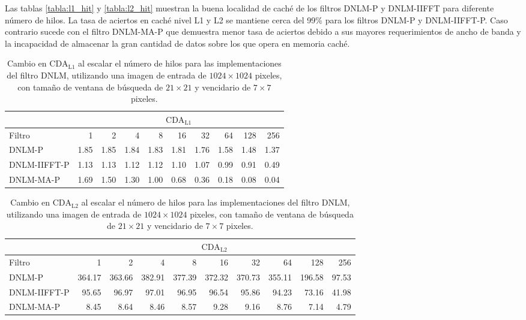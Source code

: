 Las tablas \ref{tabla:l1_hit} y \ref{tabla:l2_hit} muestran la buena localidad de cach\'e de los filtros DNLM-P y DNLM-IIFFT para diferente n\'umero de hilos. La tasa de aciertos en cach\'e nivel L1 y L2 se mantiene cerca del 99\%  para los filtros DNLM-P y DNLM-IIFFT-P. Caso contrario sucede con el filtro DNLM-MA-P que demuestra menor tasa de aciertos debido a sus mayores requerimientos de ancho de banda y la incapacidad de almacenar la gran cantidad de datos sobre los que opera en memoria cach\'e. 

\begin{table}
\centering
\caption[Cambio en la raz\'on de c\'omputo en caché L1 por acceso a datos al escalar el n\'umero de hilos]{Cambio en  $\text{CDA}_\text{L1}$ al escalar el n\'umero de hilos para las implementaciones del filtro DNLM, utilizando una imagen de entrada de $1024 \times 1024$ pixeles, con tama\~no de ventana de búsqueda de $21 \times 21$ y vencidario de $7 \times 7$ pixeles. \label{tabla:cda_l1}}
\begin{tabular}{lrrrrrrrrr}
& \multicolumn{9}{c}{$\text{CDA}_\text{L1}$} \tabularnewline
\hline
 Filtro & 1 & 2 & 4 & 8 & 16 & 32 & 64 & 128 & 256 \tabularnewline
\hline
DNLM-P & 1.85 & 1.85 & 1.84 & 1.83 & 1.81 &	1.76 & 1.58 & 1.48  & 1.37 \tabularnewline
DNLM-IIFFT-P & 1.13	& 1.13 & 1.12 & 1.12 & 1.10 & 1.07 & 0.99 & 0.91 & 0.49 \tabularnewline
DNLM-MA-P & 1.69 & 1.50 & 1.30 & 1.00 & 0.68 & 0.36 & 0.18 & 0.08 & 0.04 \tabularnewline
\end{tabular}
\end{table}



\begin{table}
\centering
\setlength\tabcolsep{2.5pt}
\setlength{\textfloatsep}{20mm}
\caption[Cambio en la raz\'on de c\'omputo en caché L2 por acceso a datos al escalar el n\'umero de hilos]{Cambio en  $\text{CDA}_\text{L2}$ al escalar el n\'umero de hilos para las implementaciones del filtro DNLM, utilizando una imagen de entrada de $1024 \times 1024$ pixeles, con tama\~no de ventana de búsqueda de $21 \times 21$ y vencidario de $7 \times 7$ pixeles. \label{tabla:cda_l2}}
\begin{tabular}{lrrrrrrrrr}
& \multicolumn{9}{c}{$\text{CDA}_\text{L2}$} \tabularnewline
\hline
 Filtro & 1 & 2 & 4 & 8 & 16 & 32 & 64 & 128 & 256 \tabularnewline
\hline
DNLM-P & 364.17 & 363.66 & 382.91 & 377.39 & 372.32 & 370.73 & 355.11 & 196.58 & 97.53	 \tabularnewline
DNLM-IIFFT-P & 95.65 & 96.97 & 97.01 & 96.95 & 96.54 & 95.86 & 94.23 & 73.16 & 41.98 \tabularnewline
DNLM-MA-P & 8.45 & 8.64 & 8.46 & 8.57 & 9.28 & 9.16 & 8.76 & 7.14 & 4.79 \tabularnewline
\end{tabular}
\end{table}


